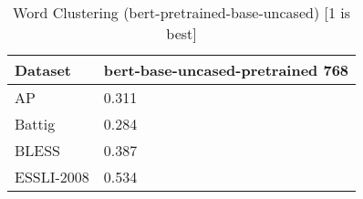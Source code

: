 \begin{table}[]
\centering
\begin{tabular}{l|l}
\hline
Dataset & bert-base-uncased-pretrained 768 \\
\hline
AP & 0.311 \\ 
Battig & 0.284 \\ 
BLESS & 0.387 \\ 
ESSLI-2008 & 0.534
\end{tabular}
\caption{Word Clustering (bert-pretrained-base-uncased) [1 is best]}
\label{tab:cluster-bert-pretrained-base-uncased}
\end{table}
